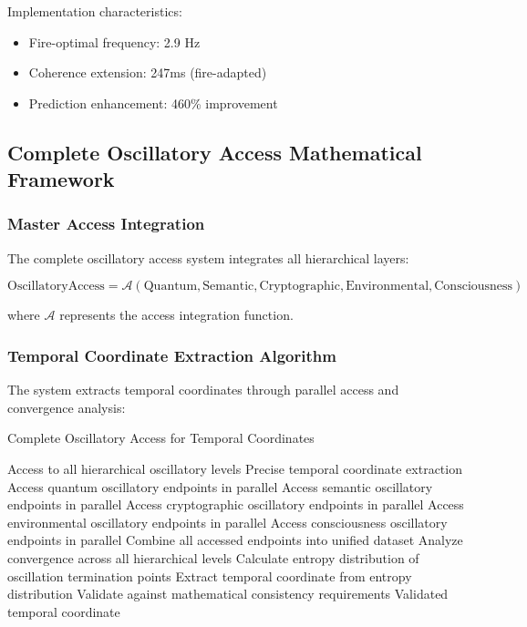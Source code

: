 \documentclass[12pt,a4paper]{article}
\begin{document}
{{{{{{{{{{{{{{Implementation characteristics:
\begin{itemize}
\item Fire-optimal frequency: 2.9 Hz
\item Coherence extension: 247ms (fire-adapted)
\item Prediction enhancement: 460\% improvement
\end{itemize}

\subsection{Complete Oscillatory Access Mathematical Framework}

\subsubsection{Master Access Integration}

The complete oscillatory access system integrates all hierarchical layers:

\begin{equation}
\text{OscillatoryAccess} = \mathcal{A}(\text{Quantum}, \text{Semantic}, \text{Cryptographic}, \text{Environmental}, \text{Consciousness})
\end{equation}

where $\mathcal{A}$ represents the access integration function.

\subsubsection{Temporal Coordinate Extraction Algorithm}

The system extracts temporal coordinates through parallel access and convergence analysis:

\begin{algorithm}[H]
\caption{Complete Oscillatory Access for Temporal Coordinates}
\begin{algorithmic}[1]
\REQUIRE Access to all hierarchical oscillatory levels
\ENSURE Precise temporal coordinate extraction
\STATE Access quantum oscillatory endpoints in parallel
\STATE Access semantic oscillatory endpoints in parallel
\STATE Access cryptographic oscillatory endpoints in parallel
\STATE Access environmental oscillatory endpoints in parallel
\STATE Access consciousness oscillatory endpoints in parallel
\STATE Combine all accessed endpoints into unified dataset
\STATE Analyze convergence across all hierarchical levels
\STATE Calculate entropy distribution of oscillation termination points
\STATE Extract temporal coordinate from entropy distribution
\STATE Validate against mathematical consistency requirements
\RETURN Validated temporal coordinate
\end{algorithmic}
\end{algorithm}

}}}}}}}}}}}}}}
\end{document}
